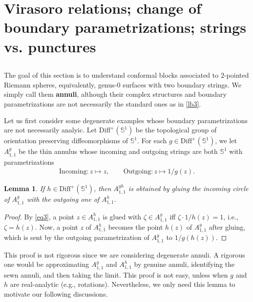 \documentclass[11pt,b5paper,notitlepage]{article}
\theoremstyle{definition}
\theoremstyle{plain}
\newtheorem{lm}[df]{Lemma}
\newcommand{\Diffp}{\mathrm{Diff}^+}
\newcommand{\Sbb}{{\mathbb S}}
\numberwithin{equation}{section}
\begin{document}
\section{Virasoro relations; change of boundary  parametrizations; strings vs. punctures}\label{lb41}




\subsection{}\label{lb9}
The goal of this section is to understand conformal blocks associated to $2$-pointed Riemann spheres, equivalently, genus-$0$ surfaces with two boundary strings. We simply call them \textbf{annuli}, although their complex structures and boundary parametrizations are not necessarily the standard ones as in \ref{lb3}.



Let us first consider some degenerate examples whose boundary parametrizations are not necessarily analyic. Let $\Diffp(\Sbb^1)$ \index{Diff@$\Diffp(\Sbb^1)$} be the topological group of orientation preserving diffeomorphisms of $\Sbb^1$. For each $g\in\Diffp(\Sbb^1)$, we let $A_{1,1}^g$ be the thin annulus whose incoming and outgoing strings are both $\Sbb^1$ with parametrizations
\begin{gather*}
\text{Incoming}: z\mapsto z,\qquad \text{Outgoing}: z\mapsto 1/g(z).	
\end{gather*}

\begin{lm}
If $h\in\Diffp(\Sbb^1)$, then $A_{1,1}^{gh}$ is obtained by gluing the incoming circle of  $A_{1,1}^g$ with the outgoing one of $A_{1,1}^h$.
\end{lm}


\begin{proof}
By \eqref{eq3}, a point $z\in A_{1,1}^h$ is glued with $\zeta\in A_{1,1}^g$ iff $\zeta\cdot 1/h(z)=1$, i.e., $\zeta=h(z)$. Now, a point $z$ of $A_{1,1}^h$ becomes the point $h(z)$ of $A_{1,1}^g$ after gluing, which is sent by the outgoing parametrization of $A_{1,1}^g$ to $1/g(h(z))$.
\end{proof}

This proof is not rigorous since we are considering degenerate annuli. A rigorous one would be approximating $A_{1,1}^g$ and $A_{1,1}^h$ by genuine annuli, identifying the sewn annuli, and then taking the limit. This proof is not easy, unless when $g$ and $h$ are real-analytic (e.g., rotations). Nevertheless, we only need this lemma to motivate our following discussions.  
\end{document}
